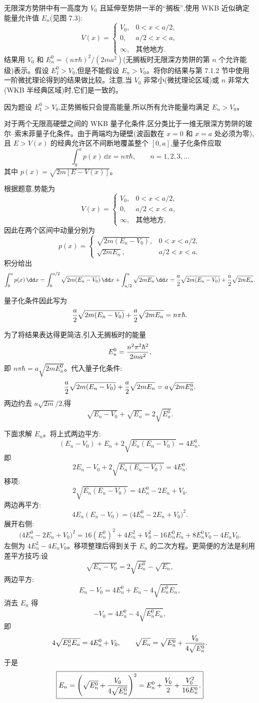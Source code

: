 \begin{question}
无限深方势阱中有一高度为 $V_0$ 且延伸至势阱一半的“搁板”,使用 WKB 近似确定能量允许值 $E_n$(见图 7.3):
\[
V(x)=\begin{cases}
V_0, & 0<x<a/2,\\
0, & a/2<x<a,\\
\infty, & \text{其他地方}.
\end{cases}
\]
结果用 $V_0$ 和 $E_n^0=(n\pi\hbar)^2/(2ma^2)$(无搁板时无限深方势阱的第 $n$ 个允许能级)表示。假设 $E_1^0>V_0$,但是不能假设 $E_n>V_0$。将你的结果与第 7.1.2 节中使用一阶微扰理论得到的结果做比较。注意,当 $V_0$ 非常小(微扰理论区域)或 $n$ 非常大(WKB 半经典区域)时,它们是一致的。
\end{question}
\begin{solution}
因为题设 $E_1^0>V_0$,正势搁板只会提高能量,所以所有允许能量均满足 $E_n>V_0$。

对于两个无限高硬壁之间的 WKB 量子化条件,区分类比于一维无限深方势阱的玻尔--索末菲量子化条件。由于两端均为硬壁(波函数在 $x=0$ 和 $x=a$ 处必须为零),且 $E>V(x)$ 的经典允许区不间断地覆盖整个 $[0,a]$,量子化条件应取
\[
\int_0^a p(x)\,\dd x=n\pi\hbar,
\qquad n=1,2,3,\ldots
\]
其中 $p(x)=\sqrt{2m[E-V(x)]}$。

根据题意,势能为
\[
V(x)=\begin{cases}
V_0, & 0<x<a/2,\\[2pt]
0, & a/2<x<a,\\[2pt]
\infty, & \text{其他地方},
\end{cases}
\]
因此在两个区间中动量分别为
\[
p(x)= \begin{cases}
\sqrt{2m(E_n-V_0)}, & 0<x<a/2,\\[4pt]
\sqrt{2mE_n}, & a/2<x<a.
\end{cases}
\]
积分给出
\[
\int_0^a p(x)\,\dd x
=\int_0^{a/2}\sqrt{2m(E_n-V_0)}\,\dd x
+\int_{a/2}^a\sqrt{2mE_n}\,\dd x
={a\over2}\sqrt{2m(E_n-V_0)}+{a\over2}\sqrt{2mE_n}.
\]

量子化条件因此写为
\[
{a\over2}\sqrt{2m(E_n-V_0)}+{a\over2}\sqrt{2mE_n}=n\pi\hbar.
\]

为了将结果表达得更简洁,引入无搁板时的能量
\[
E_n^0={n^2\pi^2\hbar^2\over2ma^2},
\]
即 $n\pi\hbar = a\sqrt{2mE_n^0}$。代入量子化条件:
\[
{a\over2}\sqrt{2m(E_n-V_0)}+{a\over2}\sqrt{2mE_n}
=a\sqrt{2mE_n^0}.
\]
两边约去 $a\sqrt{2m}/2$,得
\[
\sqrt{E_n-V_0}+\sqrt{E_n}=2\sqrt{E_n^0}.
\]

下面求解 $E_n$。将上式两边平方:
\[
(E_n-V_0)+E_n+2\sqrt{E_n(E_n-V_0)}=4E_n^0,
\]
即
\[
2E_n-V_0+2\sqrt{E_n(E_n-V_0)}=4E_n^0.
\]
移项:
\[
2\sqrt{E_n(E_n-V_0)}=4E_n^0-2E_n+V_0.
\]
两边再平方:
\[
4E_n(E_n-V_0)=\bigl(4E_n^0-2E_n+V_0\bigr)^2.
\]
展开右侧:
\[
\bigl(4E_n^0-2E_n+V_0\bigr)^2
=16(E_n^0)^2+4E_n^2+V_0^2-16E_n^0E_n+8E_n^0V_0-4E_nV_0.
\]
左侧为 $4E_n^2-4E_nV_0$。移项整理后得到关于 $E_n$ 的二次方程。更简便的方法是利用差平方技巧:设
\[
\sqrt{E_n-V_0}=2\sqrt{E_n^0}-\sqrt{E_n},
\]
两边平方:
\[
E_n-V_0=4E_n^0+E_n-4\sqrt{E_n^0E_n},
\]
消去 $E_n$ 得
\[
-V_0=4E_n^0-4\sqrt{E_n^0E_n},
\]
即
\[
4\sqrt{E_n^0E_n}=4E_n^0+V_0,
\qquad
\sqrt{E_n}=\sqrt{E_n^0}+{V_0\over4\sqrt{E_n^0}}.
\]
于是
\[
\boxed{E_n=\left(\sqrt{E_n^0}+{V_0\over4\sqrt{E_n^0}}\right)^2
=E_n^0+{V_0\over2}+{V_0^2\over16E_n^0}.}
\]


\end{solution}
